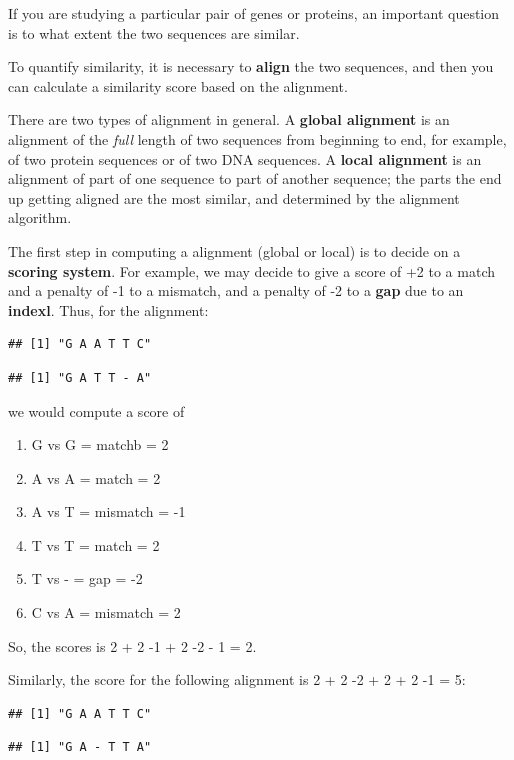 \documentclass[
]{book}
\providecommand{\tightlist}{%
  \setlength{\itemsep}{0pt}\setlength{\parskip}{0pt}}
\begin{document}
If you are studying a particular pair of genes or proteins, an important question is to what extent the two sequences are similar.

To quantify similarity, it is necessary to \textbf{align} the two sequences, and then you can calculate a similarity score based on the alignment.

There are two types of alignment in general. A \textbf{global alignment} is an alignment of the \emph{full} length of two sequences from beginning to end, for example, of two protein sequences or of two DNA sequences. A \textbf{local alignment} is an alignment of part of one sequence to part of another sequence; the parts the end up getting aligned are the most similar, and determined by the alignment algorithm.

The first step in computing a alignment (global or local) is to decide on a \textbf{scoring system}. For example, we may decide to give a score of +2 to a match and a penalty of -1 to a mismatch, and a penalty of -2 to a \textbf{gap} due to an \textbf{indexl}. Thus, for the alignment:

\begin{verbatim}
## [1] "G A A T T C"
\end{verbatim}

\begin{verbatim}
## [1] "G A T T - A"
\end{verbatim}

we would compute a score of

\begin{enumerate}
\def\labelenumi{\arabic{enumi}.}
\tightlist
\item
  G vs G = matchb = 2
\item
  A vs A = match = 2
\item
  A vs T = mismatch = -1
\item
  T vs T = match = 2
\item
  T vs - = gap = -2
\item
  C vs A = mismatch = 2
\end{enumerate}

So, the scores is 2 + 2 -1 + 2 -2 - 1 = 2.

Similarly, the score for the following alignment is 2 + 2 -2 + 2 + 2 -1 = 5:

\begin{verbatim}
## [1] "G A A T T C"
\end{verbatim}

\begin{verbatim}
## [1] "G A - T T A"
\end{verbatim}
\end{document}

